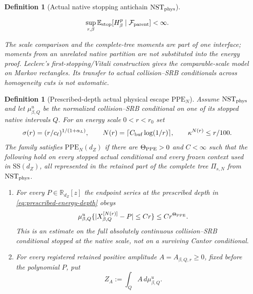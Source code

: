 \documentclass[11pt]{article}
\newtheorem{definition}[theorem]{Definition}
\begin{document}
\begin{definition}[Actual native stopping antichain
$\mathrm{NST}_{\rm phys}$]
\begin{enumerate}[label=\textup{(NST\arabic*)}]
      \begin{equation}
      \label{eq:stopped-H-moment}
       \sup_{r,\beta}
       \mathbb E_{\rm stop}[H_\beta^p\mid\mathcal F_{\rm parent}]<\infty .
      \end{equation}
\end{enumerate}
The scale comparison and the complete-tree moments are part of one interface;
moments from an unrelated native partition are not substituted into the
energy proof.  Leclerc's first-stopping/Vitali construction
\cite[Section~4]{Leclerc2026} gives the comparable-scale model on Markov
rectangles.  Its transfer to actual
collision--SRB conditionals across homogeneity cuts is not automatic.
\end{definition}

\begin{definition}[Prescribed-depth actual physical escape
$\mathrm{PPE}_{N}$]
\label{def:physical-legal-extension}
Assume $\mathrm{NST}_{\rm phys}$ and let $\mu^u_{\beta,Q}$ be the
normalized collision--SRB conditional on one of its stopped native intervals
$Q$.  For an energy scale $0<r<r_0$ set
\begin{equation}
\label{eq:prescribed-energy-depth}
 \sigma(r)=(r/c_\ell)^{1/(1+\alpha_L)},\qquad
 N(r)=\lceil C_{\rm buf}\log(1/r)\rceil ,
 \qquad \kappa^{N(r)}\le r/100 .
\end{equation}
The family satisfies $\mathrm{PPE}_{N}(d_Z)$ if there are
$\Theta_{\rm PPE}>0$ and $C<\infty$ such that the following hold on every
stopped actual conditional and every frozen context used in
$\mathrm{SS}(d_Z)$, all represented in the retained part of the complete
tree $\Pi_{s,N}$ from $\mathrm{NST}_{\rm phys}$.
\begin{enumerate}[label=\textup{(PPE\arabic*)}]
\item For every $P\in\mathbb R_{d_Z}[z]$ the endpoint series at the
      \emph{prescribed depth in \eqref{eq:prescribed-energy-depth}} obeys
      \begin{equation}
      \label{eq:ppe-prescribed-sublevel}
       \mu^u_{\beta,Q}
       \{|X^{[N(r)]}_{\beta,Q}-P|\le C r\}
       \le C r^{\Theta_{\rm PPE}} .
      \end{equation}
      This is an estimate on the full absolutely continuous collision--SRB
      conditional stopped at the native scale, not on a surviving Cantor
      conditional.
\item For every registered retained positive amplitude
      $A=A_{\beta,Q,r}\ge0$, fixed before the polynomial $P$, put
      \[
       Z_A:=\int_QA\,d\mu^u_{\beta,Q}.
\]
\end{enumerate}
\end{definition}
\end{document}
